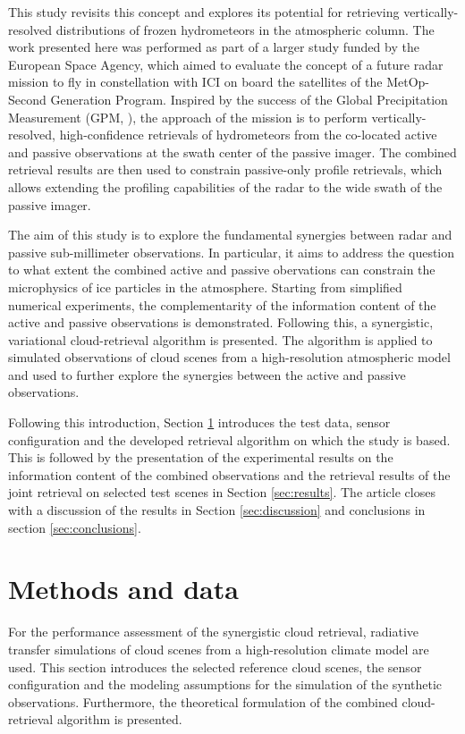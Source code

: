 \documentclass[journal abbreviation, manuscript]{copernicus}
\begin{document}
This study revisits this concept and explores its potential for retrieving
vertically-resolved distributions of frozen hydrometeors in the atmospheric
column. The work presented here was performed as part of a larger study funded
by the European Space Agency, which aimed to evaluate the concept of a future
radar mission to fly in constellation with ICI on board the satellites of the
MetOp-Second Generation Program. Inspired by the success of the Global
Precipitation Measurement (GPM, \cite{hou14}), the approach of the mission is to
perform vertically-resolved, high-confidence retrievals of hydrometeors from the
co-located active and passive observations at the swath center of the passive
imager. The combined retrieval results are then used to constrain passive-only
profile retrievals, which allows extending the profiling capabilities of the
radar to the wide swath of the passive imager.

The aim of this study is to explore the fundamental synergies between radar and
passive sub-millimeter observations. In particular, it aims to address the
question to what extent the combined active and passive obervations can
constrain the microphysics of ice particles in the atmosphere. Starting from
simplified numerical experiments, the complementarity of the information content
of the active and passive observations is demonstrated. Following this, a
synergistic, variational cloud-retrieval algorithm is presented. The algorithm
is applied to simulated observations of cloud scenes from a high-resolution
atmospheric model and used to further explore the synergies between the active
and passive observations.

Following this introduction, Section \ref{sec:methods_and_data} introduces
the test data, sensor configuration and the developed retrieval algorithm
on which the study is based. This is followed by the presentation of the
experimental results on the information content of the combined observations
and the retrieval results of the joint retrieval on selected test scenes
in Section \ref{sec:results}. The article closes with a discussion of
the results in Section \ref{sec:discussion} and conclusions in section
\ref{sec:conclusions}.


\section{Methods and data}
\label{sec:methods_and_data}

For the performance assessment of the synergistic cloud retrieval, radiative
transfer simulations of cloud scenes from a high-resolution climate model are
used. This section introduces the selected reference cloud scenes, the sensor
configuration and the modeling assumptions for the simulation of the synthetic
observations. Furthermore, the theoretical formulation of the combined
cloud-retrieval algorithm is presented.
\end{document}
